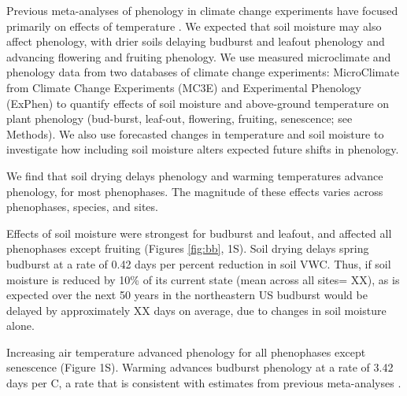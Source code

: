 \documentclass{article}
\begin{document}
\par Previous meta-analyses of phenology in climate change experiments have focused primarily on effects of temperature \citep{wolkovich2012}. We expected that soil moisture may also affect phenology, with drier soils delaying budburst and leafout phenology and advancing flowering and fruiting phenology.  We use measured microclimate and phenology data from two databases of climate change experiments: MicroClimate from Climate Change Experiments (MC3E) and Experimental Phenology (ExPhen)  to quantify effects of soil moisture and above-ground temperature on plant phenology (bud-burst, leaf-out, flowering, fruiting, senescence; see Methods). We also use forecasted changes in temperature and soil moisture to investigate how including soil moisture alters expected future shifts in phenology. 


\par We find that soil drying delays phenology and warming temperatures advance phenology, for most phenophases. The magnitude of these effects varies across phenophases, species, and sites. 
\par Effects of soil moisture were strongest for budburst and leafout, and affected all phenophases except fruiting (Figures \ref{fig:bb}, 1S). Soil drying delays spring budburst at a rate of 0.42 days per percent reduction in soil VWC. Thus, if soil moisture is reduced by 10\% of its current state (mean across all sites= XX), as is expected over the next 50 years in the northeastern US \citep{berg2017} budburst would be delayed by approximately XX days on average, due to changes in soil moisture alone.

\par  Increasing air temperature advanced phenology for all phenophases except senescence (Figure 1S). Warming advances budburst phenology at a rate of 3.42 days per \degree C, a rate that is consistent with estimates from previous meta-analyses \citep{wolkovich2012}. 

\end{document}
